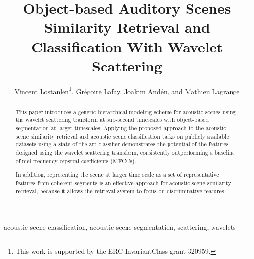 \documentclass[journal]{IEEEtran}
\begin{document}
%
\title{Object-based Auditory Scenes Similarity Retrieval and Classification With Wavelet Scattering}

\author{Vincent Lostanlen\thanks{This work is supported by the ERC InvariantClass grant 320959.}, Gr\'egoire Lafay, Joakim And\'en, and Mathieu Lagrange}


\maketitle

\begin{abstract}

This paper introduces a generic hierarchical modeling scheme for acoustic scenes using the wavelet scattering transform at sub-second timescales with object-based segmentation at larger timescales. Applying the proposed approach to the acoustic scene similarity retrieval and acoustic scene classification tasks on publicly available datasets using a state-of-the-art classifier demonstrates the potential of the features designed using the wavelet scattering transform, consistently outperforming a baseline of mel-frequency cepstral coefficients (MFCCs).

In addition, representing the scene at larger time scale as a set of representative features from coherent segments is an effective approach for acoustic scene similarity retrieval, because it allows the retrieval system to focus on discriminative features.
\end{abstract}

\begin{IEEEkeywords}
acoustic scene classification, acoustic scene segmentation, scattering, wavelets
\end{IEEEkeywords}

%
\IEEEpeerreviewmaketitle
\end{document}
